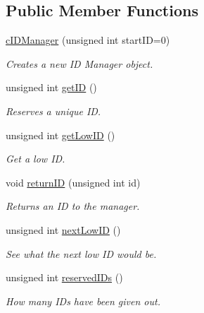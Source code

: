 \subsection*{\-Public \-Member \-Functions}
\begin{DoxyCompactItemize}
\item 
\hyperlink{classcIDManager_a59021595aaf85ebc151c207a8a04f101}{c\-I\-D\-Manager} (unsigned int start\-I\-D=0)
\begin{DoxyCompactList}\small\item\em \-Creates a new \-I\-D \-Manager object. \end{DoxyCompactList}\item 
unsigned int \hyperlink{classcIDManager_a45420147e785cc219743e9aa2c336501}{get\-I\-D} ()
\begin{DoxyCompactList}\small\item\em \-Reserves a unique \-I\-D. \end{DoxyCompactList}\item 
unsigned int \hyperlink{classcIDManager_ab0d7d0e2cb257f144fd4a7d61ade3b3f}{get\-Low\-I\-D} ()
\begin{DoxyCompactList}\small\item\em \-Get a low \-I\-D. \end{DoxyCompactList}\item 
void \hyperlink{classcIDManager_a6671d898740f88cf40860b0b9e119b02}{return\-I\-D} (unsigned int id)
\begin{DoxyCompactList}\small\item\em \-Returns an \-I\-D to the manager. \end{DoxyCompactList}\item 
unsigned int \hyperlink{classcIDManager_a03d1079ee2f934dcba77e61d605a8e01}{next\-Low\-I\-D} ()
\begin{DoxyCompactList}\small\item\em \-See what the next low \-I\-D would be. \end{DoxyCompactList}\item 
unsigned int \hyperlink{classcIDManager_aeb31ecbcb9716b38f33e96c81929b5fe}{reserved\-I\-Ds} ()
\begin{DoxyCompactList}\small\item\em \-How many \-I\-Ds have been given out. \end{DoxyCompactList}\end{DoxyCompactItemize}
